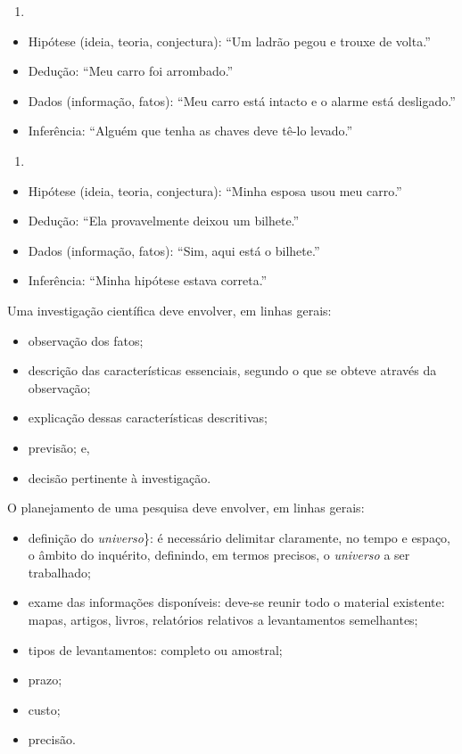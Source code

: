\documentclass[
]{book}
\providecommand{\tightlist}{%
  \setlength{\itemsep}{0pt}\setlength{\parskip}{0pt}}
\begin{document}
\begin{enumerate}
\def\labelenumi{(\Alph{enumi})}
\setcounter{enumi}{2}
\tightlist
\item
\end{enumerate}

\begin{itemize}
\tightlist
\item
  Hipótese (ideia, teoria, conjectura): ``Um ladrão pegou e trouxe de volta.''
\item
  Dedução: ``Meu carro foi arrombado.''
\item
  Dados (informação, fatos): ``Meu carro está intacto e o alarme está desligado.''
\item
  Inferência: ``Alguém que tenha as chaves deve tê-lo levado.''
\end{itemize}

\begin{enumerate}
\def\labelenumi{(\Alph{enumi})}
\setcounter{enumi}{3}
\tightlist
\item
\end{enumerate}

\begin{itemize}
\tightlist
\item
  Hipótese (ideia, teoria, conjectura): ``Minha esposa usou meu carro.''
\item
  Dedução: ``Ela provavelmente deixou um bilhete.''
\item
  Dados (informação, fatos): ``Sim, aqui está o bilhete.''
\item
  Inferência: ``Minha hipótese estava correta.''
\end{itemize}

Uma investigação científica deve envolver, em linhas gerais:

\begin{itemize}
\tightlist
\item
  observação dos fatos;
\item
  descrição das características essenciais, segundo o que se obteve através da observação;
\item
  explicação dessas características descritivas;
\item
  previsão; e,
\item
  decisão pertinente à investigação.
\end{itemize}

O planejamento de uma pesquisa deve envolver, em linhas gerais:

\begin{itemize}
\tightlist
\item
  definição do \emph{universo}\}: é necessário delimitar claramente, no tempo e espaço, o âmbito do inquérito, definindo, em termos precisos, o \emph{universo} a ser trabalhado;
\item
  exame das informações disponíveis: deve-se reunir todo o material existente: mapas, artigos, livros, relatórios relativos a levantamentos semelhantes;
\item
  tipos de levantamentos: completo ou amostral;
\item
  prazo;
\item
  custo;
\item
  precisão.
\end{itemize}
\end{document}
